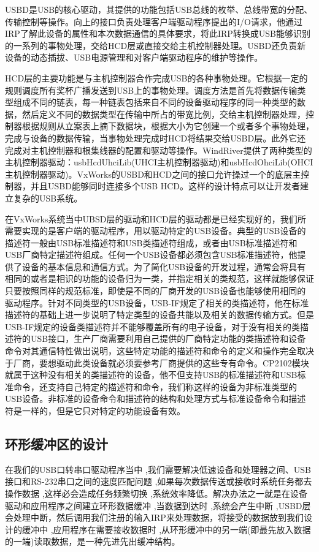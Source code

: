 	USBD是USB的核心驱动，其提供的功能包括USB总线的枚举、总线带宽的分配、传输控制等操作。向上的接口负责处理客户端驱动程序提出的I/O请求，他通过IRP了解此设备的属性和本次数据通信的具体要求，将此IRP转换成USB能够识别的一系列的事物处理，交给HCD层或直接交给主机控制器处理。USBD还负责新设备的动态插拔、USB电源管理和对客户端驱动程序的维护等操作。
	
	HCD层的主要功能是与主机控制器合作完成USB的各种事物处理。它根据一定的规则调度所有奖杯广播发送到USB上的事物处理。调度方法是首先将数据传输类型组成不同的链表，每一种链表包括来自不同的设备驱动程序的同一种类型的数据，然后定义不同的数据类型在传输中所占的带宽比例，交给主机控制器处理，控制器根据规则从立案表上摘下数据块，根据大小为它创建一个或者多个事物处理，完成与设备的数据传输，当事物处理完成时HCD将结果交给USBD层。此外它还完成对主机控制器和根集线器的配置和驱动等操作。WindRiver提供了两种类型的主机控制器驱动：usbHcdUhciLib(UHCI主机控制器驱动)和usbHcdOhciLib(OHCI主机控制器驱动)。VxWorks的USBD和HCD之间的接口允许操过一个的底层主控制器，并且USBD能够同时连接多个USB HCD。这样的设计特点可以让开发者建立复杂的USB系统。
	
	在VxWorks系统当中UBSD层的驱动和HCD层的驱动都是已经实现好的，我们所需要实现的是客户端的驱动程序，用以驱动特定的USB设备。典型的USB设备的描述符一般由USB标准描述符和USB类描述符组成，或者由USB标准描述符和USB厂商特定描述符组成。任何一个USB设备都必须包含USB标准描述符，他提供了设备的基本信息和通信方式。为了简化USB设备的开发过程，通常会将具有相同的或者是相识的功能的设备归为一类，并指定相关的类规范，这样就能够保证只要按照同样的规范标准，即使是不同的厂商开发的USB设备也能够使用相同的驱动程序。针对不同类型的USB设备，USB-IF规定了相关的类描述符，他在标准描述符的基础上进一步说明了特定类型的设备共能以及相关的数据传输方式。但是USB-IF规定的设备类描述符并不能够覆盖所有的电子设备，对于没有相关的类描述符的USB接口，生产厂商需要利用自己提供的厂商特定功能的类描述符和设备命令对其通信特性做出说明，这些特定功能的描述符和命令的定义和操作完全取决于厂商，要想驱动此类设备就必须要参考厂商提供的这些专有命令。CP2102模块就属于这种没有相关的类描述符的设备，他不但支持USB的标准描述符和USB标准命令，还支持自己特定的描述符和命令，我们称这样的设备为非标准类型的USB设备。非标准的设备命令和描述符的结构和处理方式与标准设备命令和描述符是一样的，但是它只对特定的功能设备有效。

	
	


\subsection{环形缓冲区的设计}
	在我们的USB口转串口驱动程序当中 ,我们需要解决低速设备和处理器之间、USB接口和RS-232串口之间的速度匹配问题 ,如果每次数据传送或接收时系统任务都去操作数据 ,这样必会造成任务频繁切换 ,系统效率降低。解决办法之一就是在设备驱动和应用程序之间建立环形数据缓冲 ,当数据到达时 ,系统会产生中断 ,USBD层会处理中断，然后调用我们注册的输入IRP来处理数据，将接受的数据放到我们设计的缓冲中 ,应用程序在需要接收数据时 ,从环形缓冲中的另一端(即最先放入数据的一端)读取数据，是一种先进先出缓冲结构。
		
